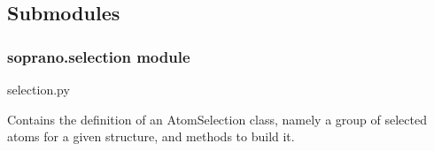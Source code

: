 \documentclass[letterpaper,10pt,english]{sphinxmanual}
\begin{document}
\subsection{Submodules}
\label{doctree/soprano:submodules}

\subsubsection{soprano.selection module}
\label{doctree/soprano.selection:module-soprano.selection}\label{doctree/soprano.selection::doc}\label{doctree/soprano.selection:soprano-selection-module}
selection.py

Contains the definition of an AtomSelection class,
namely a group of selected atoms for a given structure,
and methods to build it.
\end{document}
